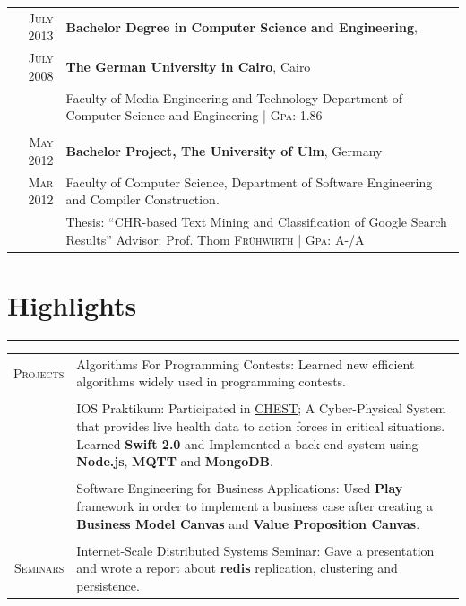 \documentclass[a4paper,13pt]{article}
\begin{document}
\begin{adjustwidth}{-3cm}{}
\begin{tabular}{r|p{17.5cm}}
\textsc{July} 2013 & \textbf{Bachelor Degree in Computer Science and Engineering},\\ \textsc{July} 2008& \normalsize\textbf{The German University in Cairo}, Cairo\\
& \small{Faculty of Media Engineering and Technology} \small{Department of Computer Science and Engineering}  \footnotesize \hfill| \normalsize \textsc{Gpa}: 1.86
\\\multicolumn{2}{c}{} \\

\textsc{May} 2012 & \textbf{Bachelor Project, The University of Ulm}, Germany\\
\textsc{Mar} 2012 & \small{Faculty of Computer Science, Department of Software Engineering and} \small{Compiler Construction.}\\ 
& \footnotesize{Thesis: ``CHR-based Text Mining and Classification of Google Search Results''}   \footnotesize{Advisor: Prof. Thom \textsc{Fr{\"u}hwirth}} \hfill| \footnotesize \normalsize \textsc{Gpa}: A-/A 
\\
\end{tabular}





\section{Highlights} \label{praktikum}
\rule[0pt]{20cm}{0.5pt}

\begin{tabular}{r|p{17.5cm}}
	\textsc{Projects} &Algorithms For Programming Contests: Learned new efficient algorithms widely used in programming contests. 
	\\\multicolumn{1}{c}{} \\
	&IOS Praktikum: Participated in \href{https://www1.in.tum.de/lehrstuhl_1/component/content/article/733#CHEST}{CHEST}; A Cyber-Physical System that provides live health data to action forces in critical situations. Learned \textbf{Swift 2.0} and Implemented a back end system using \textbf{Node.js}, \textbf{MQTT} and \textbf{MongoDB}. \\\multicolumn{1}{c}{} \\
	
	&Software Engineering for Business Applications: Used \textbf{Play} framework in order to implement a business case
	after creating a \textbf{Business Model Canvas} and \textbf{Value Proposition Canvas}.
	\\\multicolumn{1}{c}{} \\
	\textsc{Seminars} &Internet-Scale Distributed Systems Seminar: Gave a presentation and wrote a report about \textbf{redis} replication, clustering and persistence. \\
\end{tabular}



\end{adjustwidth}
\end{document}
